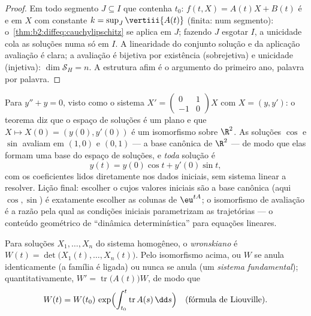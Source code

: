 \begin{proof}
Em todo segmento $J \subseteq I$ que contenha $t_0$: $f(t, X) =
A(t)X + B(t)$ é  e  em $X$ com constante $k
= \sup_J \vertiii{A(t)}$ (finita:  num segmento):
o~\cref{thm:b2:diffeq:cauchylipschitz} se aplica em $J$; fazendo $J$
esgotar $I$, a unicidade cola as soluções numa só em $I$.
A linearidade do conjunto solução e da aplicação avaliação é clara;
a avaliação é bijetiva por existência (sobrejetiva) e unicidade
(injetiva): $\dim \mathcal{S}_H = n$. A estrutura afim é o argumento do
primeiro ano, palavra por palavra.
\end{proof}

\begin{example}\label{ex:b2:diffeq:evaliso}
Para $y'' + y = 0$, visto como o sistema $X' =
\begin{pmatrix} 0 & 1\\ -1 & 0\end{pmatrix}X$ com $X = (y,
y')$: o teorema diz que o espaço de soluções é um plano e que
$X \mapsto X(0) = (y(0), y'(0))$ é um isomorfismo sobre
$\R^2$. As soluções $\cos$ e $\sin$ avaliam em $(1, 0)$
e $(0, 1)$ --- a base canônica de $\R^2$ --- de modo que elas formam
uma base do espaço de soluções, e \emph{toda} solução é
\[
y(t) = y(0)\cos t + y'(0)\sin t ,
\]
com os coeficientes lidos diretamente nos dados iniciais, sem
sistema linear a resolver. Lição final: escolher o
 cujos valores iniciais são a base
canônica (aqui $\cos, \sin$) é exatamente escolher as colunas de
$\eu^{tA}$; o isomorfismo de avaliação é a razão pela qual as condições
iniciais parametrizam as trajetórias --- o conteúdo geométrico
de ``dinâmica determinística'' para equações lineares.
\end{example}

\begin{definition}[Wronskiano]\label{def:b2:diffeq:wronskian}
Para soluções $X_1, \dots, X_n$ do sistema homogêneo, o
\emph{wronskiano} é $W(t) = \det\bigl(X_1(t),
\dots, X_n(t)\bigr)$. Pelo isomorfismo acima, ou $W$ se anula
identicamente (a família é ligada) ou nunca se anula (um \emph{sistema
fundamental}); quantitativamente, $W' = \operatorname{tr}\bigl(A(t)\bigr)
W$, de modo que
\[
W(t) = W(t_0)\,\exp\Bigl(\int_{t_0}^{t}
\operatorname{tr} A(s)\,\dd s\Bigr)
\quad \text{(fórmula de Liouville)}.
\]
\end{definition}

